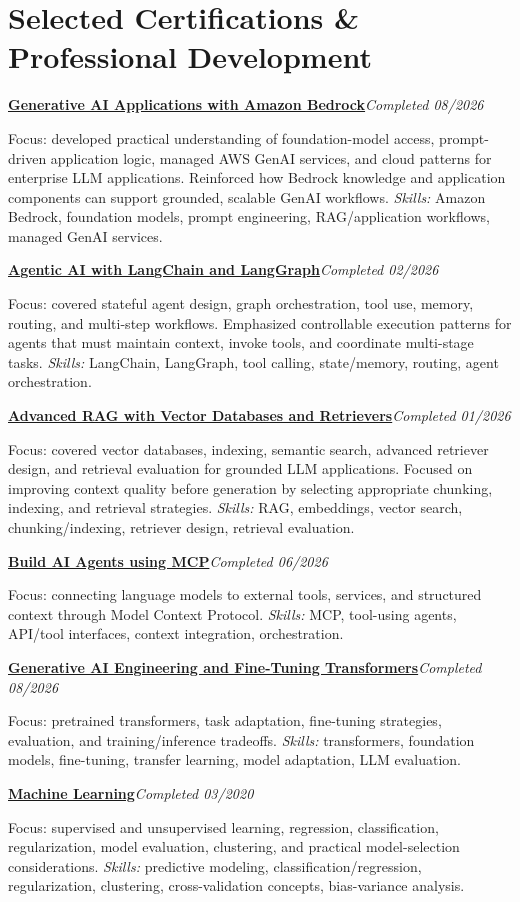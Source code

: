 \documentclass[9pt,letterpaper]{extarticle}
\newcommand{\cert}[3]{\Needspace{4\baselineskip}\textbf{#1}\hfill\textit{#2}\par{\small #3\par}}
\begin{document}
\section{Selected Certifications \& Professional Development}
\cert{\href{https://www.coursera.org/account/accomplishments/verify/3W16P8EE4BJZ}{Generative AI Applications with Amazon Bedrock}}{Completed 08/2026}{Focus: developed practical understanding of foundation-model access, prompt-driven application logic, managed AWS GenAI services, and cloud patterns for enterprise LLM applications. Reinforced how Bedrock knowledge and application components can support grounded, scalable GenAI workflows. \textit{Skills:} Amazon Bedrock, foundation models, prompt engineering, RAG/application workflows, managed GenAI services.}
\cert{\href{https://www.coursera.org/account/accomplishments/verify/L4EY4SLGCPUE}{Agentic AI with LangChain and LangGraph}}{Completed 02/2026}{Focus: covered stateful agent design, graph orchestration, tool use, memory, routing, and multi-step workflows. Emphasized controllable execution patterns for agents that must maintain context, invoke tools, and coordinate multi-stage tasks. \textit{Skills:} LangChain, LangGraph, tool calling, state/memory, routing, agent orchestration.}
\cert{\href{https://www.coursera.org/account/accomplishments/verify/AH57KRK80TBQ}{Advanced RAG with Vector Databases and Retrievers}}{Completed 01/2026}{Focus: covered vector databases, indexing, semantic search, advanced retriever design, and retrieval evaluation for grounded LLM applications. Focused on improving context quality before generation by selecting appropriate chunking, indexing, and retrieval strategies. \textit{Skills:} RAG, embeddings, vector search, chunking/indexing, retriever design, retrieval evaluation.}
\cert{\href{https://www.coursera.org/account/accomplishments/verify/QWAQ3NL4TGSZ}{Build AI Agents using MCP}}{Completed 06/2026}{Focus: connecting language models to external tools, services, and structured context through Model Context Protocol. \textit{Skills:} MCP, tool-using agents, API/tool interfaces, context integration, orchestration.}
\cert{\href{https://www.coursera.org/account/accomplishments/verify/SG4GDJ4CLPVL}{Generative AI Engineering and Fine-Tuning Transformers}}{Completed 08/2026}{Focus: pretrained transformers, task adaptation, fine-tuning strategies, evaluation, and training/inference tradeoffs. \textit{Skills:} transformers, foundation models, fine-tuning, transfer learning, model adaptation, LLM evaluation.}

\cert{\href{https://www.coursera.org/account/accomplishments/verify/VU3Y5TBLVLZT}{Machine Learning}}{Completed 03/2020}{Focus: supervised and unsupervised learning, regression, classification, regularization, model evaluation, clustering, and practical model-selection considerations. \textit{Skills:} predictive modeling, classification/regression, regularization, clustering, cross-validation concepts, bias-variance analysis.}
\end{document}
